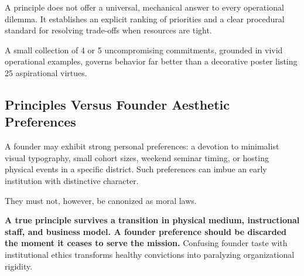 A principle does not offer a universal, mechanical answer to every operational dilemma. It establishes an explicit ranking of priorities and a clear procedural standard for resolving trade-offs when resources are tight.

A small collection of 4 or 5 uncompromising commitments, grounded in vivid operational examples, governs behavior far better than a decorative poster listing 25 aspirational virtues.

\subsection{Principles Versus Founder Aesthetic Preferences}

A founder may exhibit strong personal preferences: a devotion to minimalist visual typography, small cohort sizes, weekend seminar timing, or hosting physical events in a specific district. Such preferences can imbue an early institution with distinctive character.

They must not, however, be canonized as moral laws.

\textbf{A true principle survives a transition in physical medium, instructional staff, and business model. A founder preference should be discarded the moment it ceases to serve the mission.} Confusing founder taste with institutional ethics transforms healthy convictions into paralyzing organizational rigidity.

